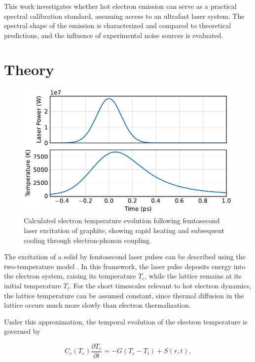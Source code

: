 \documentclass[
	parskip=half,
	a4paper,
]{scrarticle}
\begin{document}
This work investigates whether hot electron emission can serve as a practical spectral calibration standard, assuming access to an ultrafast laser system. The spectral shape of the emission is characterized and compared to theoretical predictions, and the influence of experimental noise sources is evaluated.

\section{Theory}

\begin{figure}
    \centering
    \includegraphics{../analysis/figures/model te.pdf}
    \caption{Calculated electron temperature evolution following femtosecond laser excitation of graphite, showing rapid heating and subsequent cooling through electron-phonon coupling.}
    \label{fig:temperature}
\end{figure}

The excitation of a solid by femtosecond laser pulses can be described using the two-temperature model \cite{roob_thermal_2025,lui_ultrafast_2010}. In this framework, the laser pulse deposits energy into the electron system, raising its temperature \( T_e \), while the lattice remains at its initial temperature \( T_l \). For the short timescales relevant to hot electron dynamics, the lattice temperature can be assumed constant, since thermal diffusion in the lattice occurs much more slowly than electron thermalization.

Under this approximation, the temporal evolution of the electron temperature is governed by

\begin{equation}
C_e(T_e) \frac{\partial T_e}{\partial t} = -G(T_e - T_l) + S(r,t),
\end{equation}
\end{document}
